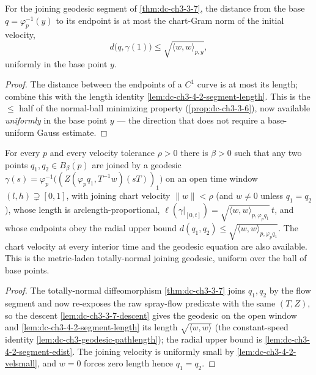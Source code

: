 \begin{lemma}
  \label{lem:dc-ch3-4-2-segment-edist}


  For the joining geodesic segment of \cref{thm:dc-ch3-3-7}, the distance from the base
  $q=\varphi_p^{-1}(y)$ to its endpoint is at most the chart-Gram norm of the initial velocity,
  \[
    d\big(q,\gamma(1)\big)\le\sqrt{\langle w,w\rangle_{p,y}},
  \]
  uniformly in the base point $y$.
\end{lemma}
\begin{proof}
  \sketch

  The distance between the endpoints of a $C^1$ curve is at most its length; combine this with the
  length identity \cref{lem:dc-ch3-4-2-segment-length}. This is the $\le$ half of the normal-ball
  minimizing property (\cref{prop:dc-ch3-3-6}), now available \emph{uniformly} in the base point $y$
  --- the direction that does not require a base-uniform Gauss estimate.
\end{proof}

\begin{lemma}
  \label{lem:dc-ch3-4-2-join-metric}


  For every $p$ and every velocity tolerance $\rho>0$ there is $\beta>0$ such that any two points
  $q_1,q_2\in\overline{B_\beta(p)}$ are joined by a geodesic
  $\gamma(s)=\varphi_p^{-1}\big((Z(\varphi_p q_1,T^{-1}w)(sT))_1\big)$ on an open time window
  $(l,h)\supsetneq[0,1]$, with joining chart velocity $\|w\|<\rho$ (and $w\neq0$ unless $q_1=q_2$),
  whose length is arclength-proportional,
  $\ell(\gamma|_{[0,t]})=\sqrt{\langle w,w\rangle_{p,\varphi_p q_1}}\,t$, and whose endpoints obey the
  radial upper bound $d(q_1,q_2)\le\sqrt{\langle w,w\rangle_{p,\varphi_p q_1}}$. The chart velocity at
  every interior time and the geodesic equation are also available. This is the metric-laden
  totally-normal joining geodesic, uniform over the ball of base points.
\end{lemma}
\begin{proof}
  \sketch

  The totally-normal diffeomorphism \cref{thm:dc-ch3-3-7} joins $q_1,q_2$ by the flow segment and now
  re-exposes the raw spray-flow predicate with the same $(T,Z)$, so the descent
  \cref{lem:dc-ch3-3-7-descent} gives the geodesic on the open window and
  \cref{lem:dc-ch3-4-2-segment-length} its length $\sqrt{\langle w,w\rangle}$ (the constant-speed
  identity \cref{lem:dc-ch3-geodesic-pathlength}); the radial upper bound is
  \cref{lem:dc-ch3-4-2-segment-edist}. The joining velocity is uniformly small by
  \cref{lem:dc-ch3-4-2-velsmall}, and $w=0$ forces zero length hence $q_1=q_2$.
\end{proof}

